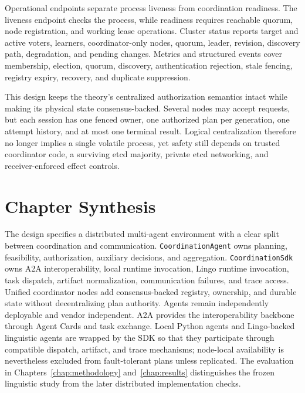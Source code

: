 Operational endpoints separate process liveness from coordination readiness. The liveness endpoint checks the process, while readiness requires reachable quorum, node registration, and working lease operations. Cluster status reports target and active voters, learners, coordinator-only nodes, quorum, leader, revision, discovery path, degradation, and pending changes. Metrics and structured events cover membership, election, quorum, discovery, authentication rejection, stale fencing, registry expiry, recovery, and duplicate suppression.

This design keeps the theory's centralized authorization semantics intact while making its physical state consensus-backed. Several nodes may accept requests, but each session has one fenced owner, one authorized plan per generation, one attempt history, and at most one terminal result. Logical centralization therefore no longer implies a single volatile process, yet safety still depends on trusted coordinator code, a surviving etcd majority, private etcd networking, and receiver-enforced effect controls.

\section{Chapter Synthesis}

The design specifies a distributed multi-agent environment with a clear split between coordination and communication. \texttt{CoordinationAgent} owns planning, feasibility, authorization, auxiliary decisions, and aggregation. \texttt{CoordinationSdk} owns A2A interoperability, local runtime invocation, Lingo runtime invocation, task dispatch, artifact normalization, communication failures, and trace access. Unified coordinator nodes add consensus-backed registry, ownership, and durable state without decentralizing plan authority. Agents remain independently deployable and vendor independent. A2A provides the interoperability backbone through Agent Cards and task exchange. Local Python agents and Lingo-backed linguistic agents are wrapped by the SDK so that they participate through compatible dispatch, artifact, and trace mechanisms; node-local availability is nevertheless excluded from fault-tolerant plans unless replicated. The evaluation in Chapters~\ref{chap:methodology} and~\ref{chap:results} distinguishes the frozen linguistic study from the later distributed implementation checks.
